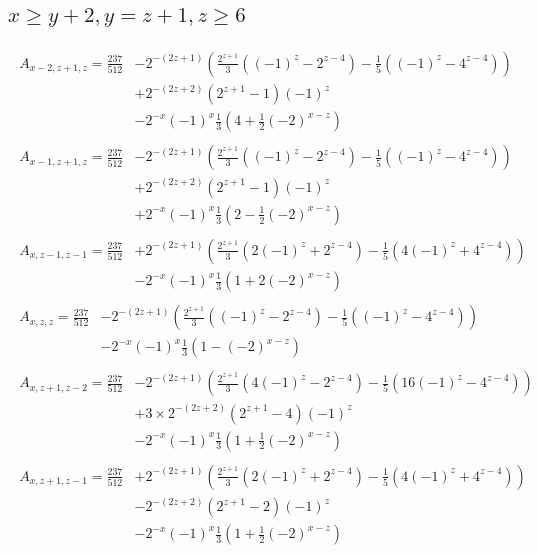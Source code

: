 \newpage
\subsection*{$x\ge y+2,y=z+1,z\ge6$}
\begin{align*}
\begin{split}
A_{x-2,z+1,z}=\frac{237}{512} &-2^{-(2z+1)}\left(\frac{2^{z+1}}{3}\left((-1)^z-2^{z-4}\right)-\frac{1}{5}\left((-1)^z-4^{z-4}\right)\right)\\
& +2^{-(2z+2)}\left(2^{z+1}-1\right)(-1)^z\\
& -2^{-x}(-1)^x\frac{1}{3}\left(4+\frac{1}{2}(-2)^{x-z}\right)
\end{split}\\
\begin{split}
A_{x-1,z+1,z}=\frac{237}{512} &-2^{-(2z+1)}\left(\frac{2^{z+1}}{3}\left((-1)^z-2^{z-4}\right)-\frac{1}{5}\left((-1)^z-4^{z-4}\right)\right)\\
& +2^{-(2z+2)}\left(2^{z+1}-1\right)(-1)^z\\
& +2^{-x}(-1)^x\frac{1}{3}\left(2-\frac{1}{2}(-2)^{x-z}\right)
\end{split}\\
\begin{split}
A_{x,z-1,z-1}=\frac{237}{512} &+2^{-(2z+1)}\left(\frac{2^{z+1}}{3}\left(2(-1)^z+2^{z-4}\right)-\frac{1}{5}\left(4(-1)^z+4^{z-4}\right)\right)\\
& -2^{-x}(-1)^x\frac{1}{3}\left(1+2(-2)^{x-z}\right)
\end{split}\\
\begin{split}
A_{x,z,z}=\frac{237}{512} &-2^{-(2z+1)}\left(\frac{2^{z+1}}{3}\left((-1)^z-2^{z-4}\right)-\frac{1}{5}\left((-1)^z-4^{z-4}\right)\right)\\
& -2^{-x}(-1)^x\frac{1}{3}\left(1-(-2)^{x-z}\right)
\end{split}\\
\begin{split}
A_{x,z+1,z-2}=\frac{237}{512} &-2^{-(2z+1)}\left(\frac{2^{z+1}}{3}\left(4(-1)^z-2^{z-4}\right)-\frac{1}{5}\left(16(-1)^z-4^{z-4}\right)\right)\\
& +3\times2^{-(2z+2)}\left(2^{z+1}-4\right)(-1)^z\\
& -2^{-x}(-1)^x\frac{1}{3}\left(1+\frac{1}{2}(-2)^{x-z}\right)
\end{split}\\
\begin{split}
A_{x,z+1,z-1}=\frac{237}{512} &+2^{-(2z+1)}\left(\frac{2^{z+1}}{3}\left(2(-1)^z+2^{z-4}\right)-\frac{1}{5}\left(4(-1)^z+4^{z-4}\right)\right)\\
& -2^{-(2z+2)}\left(2^{z+1}-2\right)(-1)^z\\
& -2^{-x}(-1)^x\frac{1}{3}\left(1+\frac{1}{2}(-2)^{x-z}\right)
\end{split}
\end{align*}

